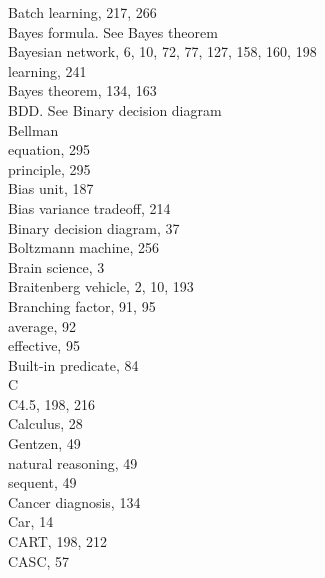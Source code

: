 \documentclass[10pt]{book}
\begin{document}
Batch learning, 217, 266\\
Bayes formula. See Bayes theorem\\
Bayesian network, 6, 10, 72, 77, 127, 158, 160, 198\\
learning, 241\\
Bayes theorem, 134, 163\\
BDD. See Binary decision diagram\\
Bellman\\
equation, 295\\
principle, 295\\
Bias unit, 187\\
Bias variance tradeoff, 214\\
Binary decision diagram, 37\\
Boltzmann machine, 256\\
Brain science, 3\\
Braitenberg vehicle, 2, 10, 193\\
Branching factor, 91, 95\\
average, 92\\
effective, 95\\
Built-in predicate, 84\\
C\\
C4.5, 198, 216\\
Calculus, 28\\
Gentzen, 49\\
natural reasoning, 49\\
sequent, 49\\
Cancer diagnosis, 134\\
Car, 14\\
CART, 198, 212\\
CASC, 57\\
\end{document}
